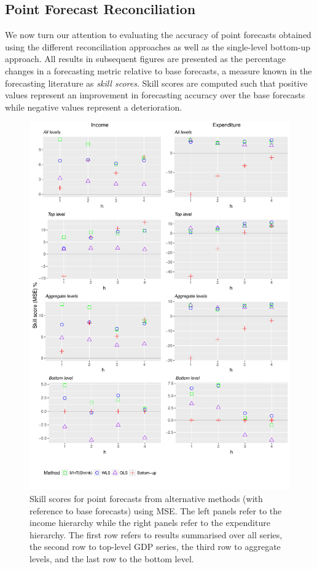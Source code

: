 \documentclass[graybox]{svmult}
\begin{document}
\subsection{Point Forecast Reconciliation}

We now turn our attention to evaluating the accuracy of point forecasts obtained using the different reconciliation approaches as well as the single-level bottom-up approach. All results in subsequent figures are presented as the percentage changes in a forecasting metric relative to base forecasts, a measure known in the forecasting literature as \emph{skill scores}. Skill scores are computed such that positive values represent an improvement in forecasting accuracy over the base forecasts while negative values represent a deterioration.

\begin{figure}
	\centering
	\small
	\includegraphics[width=\textwidth]{Figs/Results/PointF_MSE.pdf}
	\caption{Skill scores for point forecasts from alternative methods (with reference to base forecasts) using MSE\@. The left panels refer to the income hierarchy while the right panels refer to the expenditure hierarchy. The first row refers to results summarised over all series, the second row to top-level GDP series, the third row to aggregate levels, and the last row to the bottom level.}
	\label{fig: PointF_MSE}
\end{figure}
\end{document}
